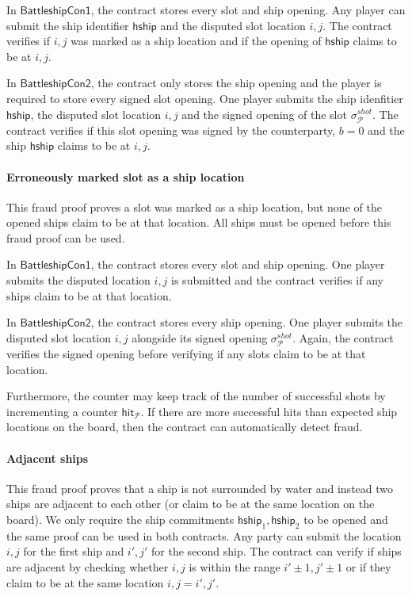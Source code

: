 \documentclass{llncs}
\newcommand{\hship}{\mathsf{hship}}
\newcommand{\participant}{\mathcal{P}}
\begin{document}
In $\mathsf{BattleshipCon1}$, the contract stores every slot and ship opening. 
Any player can submit the ship identifier $\hship$ and the disputed slot location $i,j$.
The contract verifies if $i,j$ was marked as a ship location and if the opening of $\hship$ claims to be at $i,j$. 

In $\mathsf{BattleshipCon2}$, the contract only stores the ship opening and the player is required to store every signed slot opening. 
One player submits the ship idenfitier $\hship$, the disputed slot location $i,j$ and the signed opening of the slot $\sigma^{shot}_{\participant}$. 
The contract verifies if this slot opening was signed by the counterparty,  $b = 0$ and the ship $\hship$ claims to be at $i,j$.   

\paragraph{Erroneously marked  slot as a ship location} 
This fraud proof proves a slot was marked as a ship location, but none of the opened ships claim to be at that location.
All ships must be opened before this fraud proof can be used. 

In $\mathsf{BattleshipCon1}$, the contract stores every slot and ship opening. 
One player submits the disputed location $i,j$ is submitted and the contract verifies if any ships claim to be at that location. 

In $\mathsf{BattleshipCon2}$, the contract stores every ship opening.
One player submits the disputed slot location $i,j$ alongside its signed opening $\sigma^{shot}_{\participant}$. 
Again, the contract verifies the signed opening before verifying if any slots claim to be at that location. 

Furthermore, the counter may keep track of the number of successful shots by incrementing a counter $\mathsf{hit}_{\participant}$. 
If there are more successful hits than expected ship locations on the board, then the contract can automatically detect fraud. 

\paragraph{Adjacent ships} 
This fraud proof proves that a ship is not surrounded by water and instead two ships are adjacent to each other (or claim to be at the same location on the board). 
We only require the ship commitments $\hship_{1},\hship_{2}$ to be opened and the same proof can be used in both contracts. 
Any party can submit the location $i,j$ for the first ship and $i',j'$ for the second ship.  
The contract can verify if ships are adjacent by checking whether $i,j$ is within the range $i'\pm1, j'\pm1$ or if they claim to be at the same location $i,j = i',j'$.
\end{document}
